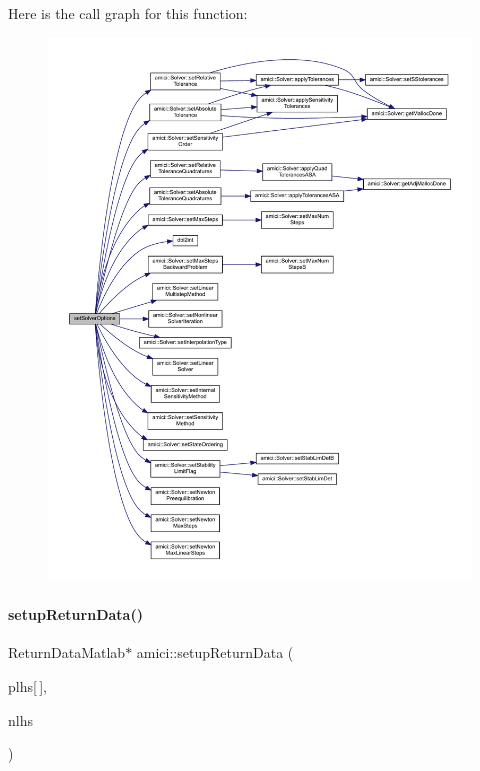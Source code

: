 Here is the call graph for this function\+:
\nopagebreak
\begin{figure}[H]
\begin{center}
\leavevmode
\includegraphics[width=350pt]{namespaceamici_aab6be0027d918715e2ba50828088110b_cgraph}
\end{center}
\end{figure}
\mbox{\label{namespaceamici_a91a3ac85998f7dd60d633882e9504b07}} 
\paragraph{\texorpdfstring{setup\+Return\+Data()}{setupReturnData()}}
{\footnotesize\ttfamily Return\+Data\+Matlab$\ast$ amici\+::setup\+Return\+Data (\begin{DoxyParamCaption}\item[{mx\+Array $\ast$}]{plhs\mbox{[}$\,$\mbox{]},  }\item[{int}]{nlhs }\end{DoxyParamCaption})}

